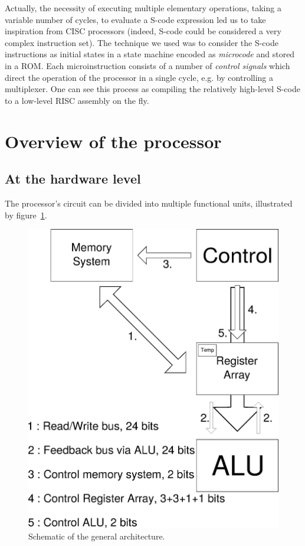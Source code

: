 \documentclass[a4paper, 11pt]{article}
\begin{document}
Actually, the necessity of executing multiple elementary operations, taking a variable number of cycles, to evaluate a S-code expression led us to take inspiration from CISC processors (indeed, S-code could be considered a very complex instruction set). The technique we used was to consider the S-code instructions as initial states in a state machine encoded as \emph{microcode} and stored in a ROM. Each microinstruction consists of a number of \emph{control signals} which direct the operation of the processor in a single cycle, e.g. by controlling a multiplexer. One can see this process as compiling the relatively high-level S-code to a low-level RISC assembly on the fly.

\section{Overview of the processor}

\subsection{At the hardware level}

The processor's circuit can be divided into multiple functional units,
illustrated by figure~\ref{general}.

\begin{figure}[h]
\center
\caption{\label{general}Schematic of the general architecture.}
   \includegraphics[scale=0.5]{globalArchi.eps}
\end{figure}
\end{document}
